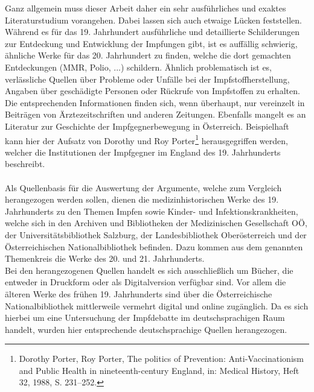 \documentclass[
    a4paper,
    12pt,
    hyphens,
    chapterprefix=true,
    headheight=33pt,
    footheight=29pt,
    headings=optiontohead, %
]{scrartcl}
\begin{document}
Ganz allgemein muss dieser Arbeit daher ein sehr ausführliches und exaktes Literaturstudium vorangehen. Dabei lassen sich auch etwaige Lücken feststellen. Während es für das 19. Jahrhundert ausführliche und detaillierte Schilderungen zur Entdeckung und Entwicklung der Impfungen gibt, ist es auffällig schwierig, ähnliche Werke für das 20. Jahrhundert zu finden, welche die dort gemachten Entdeckungen (MMR, Polio, ...) schildern. Ähnlich problematisch ist es, verlässliche Quellen über Probleme oder Unfälle bei der Impfstoffherstellung, Angaben über geschädigte Personen oder Rückrufe von Impfstoffen zu erhalten. Die entsprechenden Informationen finden sich, wenn überhaupt, nur vereinzelt in Beiträgen von Ärztezeitschriften und anderen Zeitungen. Ebenfalls mangelt es an Literatur zur Geschichte der Impfgegnerbewegung in Österreich. Beispielhaft kann hier der Aufsatz von Dorothy und Roy Porter\footnote{Dorothy Porter, Roy Porter, The politics of Prevention: Anti-Vaccinationism and Public Health in nineteenth-century England, in: Medical History, Heft 32, 1988, S. 231--252.} herausgegriffen werden, welcher die Institutionen der Impfgegner im England des 19. Jahrhunderts beschreibt.\\
\\
Als Quellenbasis für die Auswertung der Argumente, welche zum Vergleich herangezogen werden sollen, dienen die medizinhistorischen Werke des 19. Jahrhunderts zu den Themen Impfen sowie Kinder- und Infektionskrankheiten, welche sich in den Archiven und Bibliotheken der Medizinischen Gesellschaft OÖ, der Universitätsbibliothek Salzburg, der Landesbibliothek Oberösterreich und der Österreichischen Nationalbibliothek befinden. Dazu kommen aus dem genannten Themenkreis die Werke des 20. und 21. Jahrhunderts.\\ 
Bei den herangezogenen Quellen handelt es sich ausschließlich um Bücher, die entweder in Druckform oder als Digitalversion verfügbar sind. Vor allem die älteren Werke des frühen 19. Jahrhunderts sind über die Österreichische Nationalbibliothek mittlerweile vermehrt digital und online zugänglich. Da es sich hierbei um eine Untersuchung der Impfdebatte im deutschsprachigen Raum handelt, wurden hier entsprechende deutschsprachige Quellen herangezogen.\\
\end{document}
